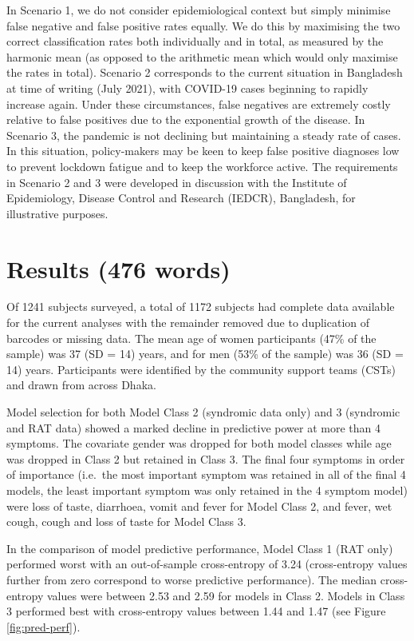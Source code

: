\documentclass[]{elsarticle} %
\begin{document}
In Scenario 1, we do not consider epidemiological context but simply minimise false negative and false positive rates equally.
We do this by maximising the two correct classification rates both individually and in total, as measured by the harmonic mean (as opposed to the arithmetic mean which would only maximise the rates in total).
Scenario 2 corresponds to the current situation in Bangladesh at time of writing (July 2021), with COVID-19 cases beginning to rapidly increase again.
Under these circumstances, false negatives are extremely costly relative to false positives due to the exponential growth of the disease.
In Scenario 3, the pandemic is not declining but maintaining a steady rate of cases.
In this situation, policy-makers may be keen to keep false positive diagnoses low to prevent lockdown fatigue and to keep the workforce active.
The requirements in Scenario 2 and 3 were developed in discussion with the Institute of Epidemiology, Disease Control and Research (IEDCR), Bangladesh, for illustrative purposes.

\hypertarget{results-476-words}{%
\section{Results (476 words)}\label{results-476-words}}

Of 1241 subjects surveyed, a total of 1172 subjects had complete data available for the current analyses with the remainder removed due to duplication of barcodes or missing data.
The mean age of women participants (47\% of the sample) was 37 (SD = 14) years, and for men (53\% of the sample) was 36 (SD = 14) years.
Participants were identified by the community support teams (CSTs) and drawn from across Dhaka.

Model selection for both Model Class 2 (syndromic data only) and 3 (syndromic and RAT data) showed a marked decline in predictive power at more than 4 symptoms.
The covariate gender was dropped for both model classes while age was dropped in Class 2 but retained in Class 3.
The final four symptoms in order of importance (i.e.~the most important symptom was retained in all of the final 4 models, the least important symptom was only retained in the 4 symptom model) were loss of taste, diarrhoea, vomit and fever for Model Class 2, and fever, wet cough, cough and loss of taste for Model Class 3.

In the comparison of model predictive performance, Model Class 1 (RAT only) performed worst with an out-of-sample cross-entropy of 3.24 (cross-entropy values further from zero correspond to worse predictive performance).
The median cross-entropy values were between 2.53 and 2.59 for models in Class 2.
Models in Class 3 performed best with cross-entropy values between 1.44 and 1.47 (see Figure \ref{fig:pred-perf}).
\end{document}
